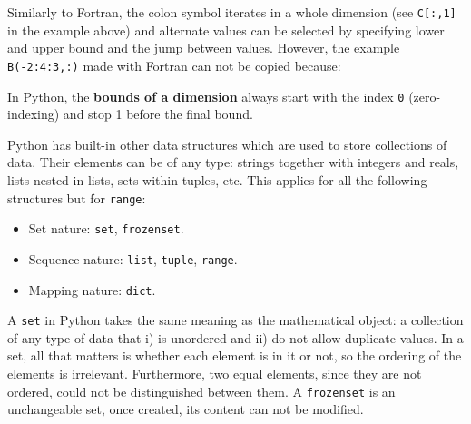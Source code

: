 Similarly to Fortran, the colon symbol iterates in a whole dimension (see \texttt{C[:,1]} in the example above) and 
alternate values can be selected by specifying lower and upper bound and the jump between values.
However, the example \texttt{B(-2:4:3,:)} made with Fortran can not be copied because:
\begin{IN}
In Python, the \textbf{bounds of a dimension} always start with the index \texttt{0} (zero-indexing) and
stop 1 before the final bound.  
\end{IN}









\vspace{0.5cm}
Python has built-in other data structures which are used to store collections of data.
Their elements can be of any type: strings together with integers and reals, lists nested in lists, sets within tuples, etc. 
This applies for all the following structures but for \texttt{range}:
\vspace{-.5cm}
\begin{itemize}[noitemsep]    
    \item Set nature: \texttt{set}, \texttt{frozenset}.
    \item Sequence nature: \texttt{list}, \texttt{tuple}, \texttt{range}.
    \item Mapping nature: \texttt{dict}.
\end{itemize}
\vspace{-.5cm}

A \texttt{set} in Python takes the same meaning as the mathematical object: a collection of any type of data that 
i) is unordered and 
ii) do not allow duplicate values. 
In a set, all that matters is whether each element is in it or not, so the ordering of the elements is irrelevant.
Furthermore, two equal elements, since they are not ordered, could not be distinguished between them. 
A \texttt{frozenset} is an unchangeable set, once created, its content can not be modified. 



